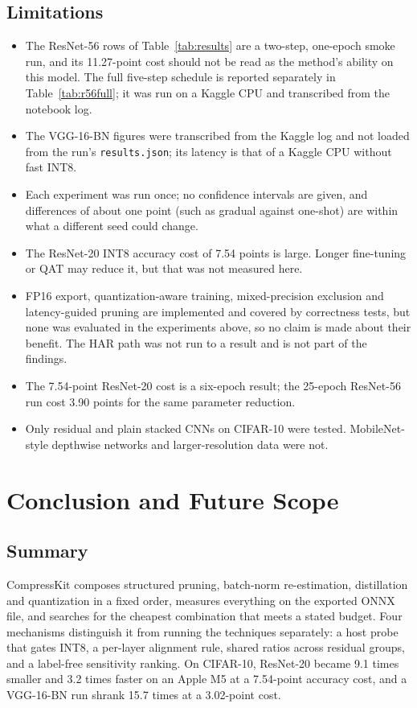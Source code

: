 \documentclass[oneside,a4paper,12pt]{report}
\newcommand{\code}[1]{\texttt{\small #1}}
\begin{document}
\section{Limitations}
\begin{itemize}
\item The ResNet-56 rows of Table~\ref{tab:results} are a two-step, one-epoch smoke run, and its 11.27-point cost should not be read as the method's ability on this model. The full five-step schedule is reported separately in Table~\ref{tab:r56full}; it was run on a Kaggle CPU and transcribed from the notebook log.
\item The VGG-16-BN figures were transcribed from the Kaggle log and not loaded from the run's \code{results.json}; its latency is that of a Kaggle CPU without fast INT8.
\item Each experiment was run once; no confidence intervals are given, and differences of about one point (such as gradual against one-shot) are within what a different seed could change.
\item The ResNet-20 INT8 accuracy cost of 7.54 points is large. Longer fine-tuning or QAT may reduce it, but that was not measured here.
\item FP16 export, quantization-aware training, mixed-precision exclusion and latency-guided pruning are implemented and covered by correctness tests, but none was evaluated in the experiments above, so no claim is made about their benefit. The HAR path was not run to a result and is not part of the findings.
\item The 7.54-point ResNet-20 cost is a six-epoch result; the 25-epoch ResNet-56 run cost 3.90 points for the same parameter reduction.
\item Only residual and plain stacked CNNs on CIFAR-10 were tested. MobileNet-style depthwise networks and larger-resolution data were not.
\end{itemize}

\chapter{Conclusion and Future Scope}
\section{Summary}
CompressKit composes structured pruning, batch-norm re-estimation, distillation and quantization in a fixed order, measures everything on the exported ONNX file, and searches for the cheapest combination that meets a stated budget. Four mechanisms distinguish it from running the techniques separately: a host probe that gates INT8, a per-layer alignment rule, shared ratios across residual groups, and a label-free sensitivity ranking. On CIFAR-10, ResNet-20 became 9.1 times smaller and 3.2 times faster on an Apple M5 at a 7.54-point accuracy cost, and a VGG-16-BN run shrank 15.7 times at a 3.02-point cost.
\end{document}
